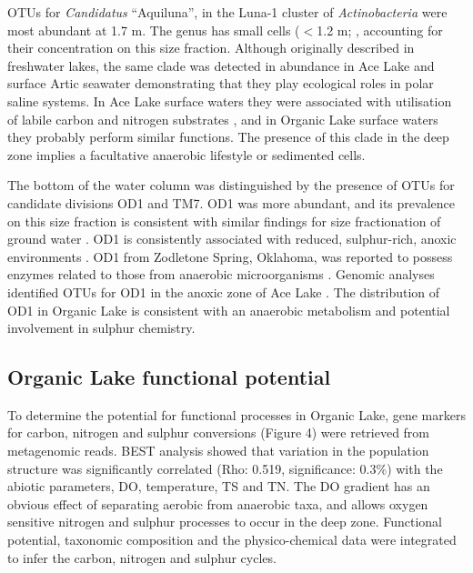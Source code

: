 \acp{OTU} for \emph{Candidatus} “Aquiluna”, in the Luna-1 cluster of \emph{Actinobacteria} \cite{Hahn2004, Hahn2009} were most abundant at 1.7 m. 
The genus has small cells ($<$1.2 \textmu{}m; \cite{Hahn2009}, accounting for their concentration on this size fraction. 
Although originally described in freshwater lakes, the same clade was detected in abundance in Ace Lake \cite{Lauro2011} and surface Artic seawater \cite{Kang2012} demonstrating that they play ecological roles in polar saline systems. 
In Ace Lake surface waters they were associated with utilisation of labile carbon and nitrogen substrates \cite{Lauro2011}, and in Organic Lake surface waters they probably perform similar functions. 
The presence of this clade in the deep zone implies a facultative anaerobic lifestyle or sedimented cells. 

The bottom of the water column was distinguished by the presence of \acp{OTU} for candidate divisions OD1 and TM7. 
OD1 was more abundant, and its prevalence on this size fraction is consistent with similar findings for size fractionation of ground water \cite{Miyoshi2005}. 
OD1 is consistently associated with reduced, sulphur-rich, anoxic environments \cite{Harris2004, Elshahed2005}. 
OD1 from Zodletone Spring, Oklahoma, was reported to possess enzymes related to those from anaerobic microorganisms \cite{Elshahed2005}. 
Genomic analyses identified \acp{OTU} for OD1 in the anoxic zone of Ace Lake \cite{Lauro2011}. 
The distribution of OD1 in Organic Lake is consistent with an anaerobic metabolism and potential involvement in sulphur chemistry. 


\subsection{Organic Lake functional potential}
To determine the potential for functional processes in Organic Lake, gene markers for carbon, nitrogen and sulphur conversions (Figure 4) were retrieved from metagenomic reads. 
BEST analysis showed that variation in the population structure was significantly correlated (Rho: 0.519, significance: 0.3\%) with the abiotic parameters, \ac{DO}, temperature, \ac{TS} and \ac{TN}. 
The \ac{DO} gradient has an obvious effect of separating aerobic from anaerobic taxa, and allows oxygen sensitive nitrogen and sulphur processes to occur in the deep zone. 
Functional potential, taxonomic composition and the physico-chemical data were integrated to infer the carbon, nitrogen and sulphur cycles.

